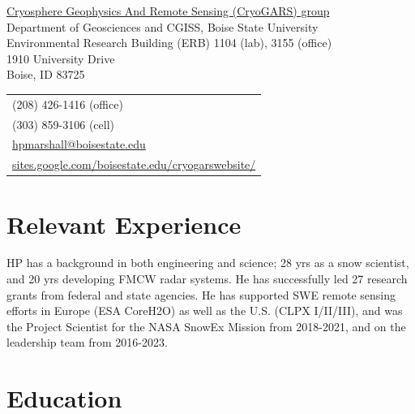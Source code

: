 \documentclass[11pt]{article}
\def\name{Hans-Peter Marshall}
\begin{document}




\begin{minipage}{0.60\linewidth}
  \href{https://sites.google.com/boisestate.edu/cryogarswebsite/}{Cryosphere Geophysics And Remote Sensing (CryoGARS) group} \\
  Department of Geosciences and CGISS, Boise State University \\
  Environmental Research Building (ERB) 1104 (lab), 3155 (office) \\
  1910 University Drive \\
  Boise, ID  83725
\end{minipage}
\begin{minipage}{0.30\linewidth}
  \begin{tabular}{l}
     (208) 426-1416 (office) \\
     (303) 859-3106 (cell) \\
    \href{mailto:hpmarshall@boisestate.edu}{hpmarshall@boisestate.edu} \\
    \href{https://sites.google.com/boisestate.edu/cryogarswebsite/}{sites.google.com/boisestate.edu/cryogarswebsite/} \\
  \end{tabular}
\end{minipage}

\section*{Relevant Experience}
HP has a background in both engineering and science; 28 yrs as a snow scientist, and 20 yrs developing FMCW radar systems.  He has successfully led 27 research grants from federal and state agencies.  He has supported SWE remote sensing efforts in Europe (ESA CoreH2O) as well as the U.S. (CLPX I/II/III), and was the Project Scientist for the NASA SnowEx Mission from 2018-2021, and on the leadership team from 2016-2023.

\section*{Education}
\end{document}
